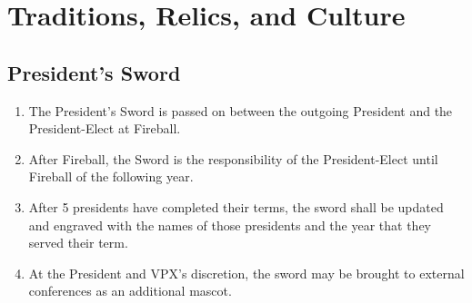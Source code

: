 \section{Traditions, Relics, and Culture}
\label{traditions-relics-and-culture}

\subsection{President's Sword}
\label{presidents-sword}
\begin{enumerate}
 \item
  The President’s Sword is passed on between the outgoing President and the President-Elect at Fireball.
 \item
  After Fireball, the Sword is the responsibility of the President-Elect until Fireball of the following year.
 \item
  After 5 presidents have completed their terms, the sword shall be updated and engraved with the names of those presidents and the year that they served their term.
 \item
  At the President and VPX’s discretion, the sword may be brought to external conferences as an additional mascot.
\end{enumerate}